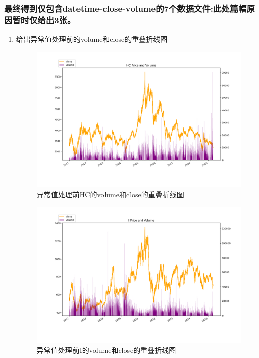 \documentclass[a4paper,11pt]{ctexart}
\begin{document}
\subsubsection{最终得到仅包含datetime-close-volume的7个数据文件:此处篇幅原因暂时仅给出3张。}
\begin{enumerate}
  \item 给出异常值处理前的volume和close的重叠折线图
\FloatBarrier
\noindent
\begin{figure}[H]
  \centering
  \includegraphics[width=\textwidth]{./v2/v0/HC.png}
  \caption*{异常值处理前HC的volume和close的重叠折线图}
\end{figure}
\begin{figure}[H]
  \centering
  \includegraphics[width=\textwidth]{./v2/v0/I.png}
  \caption*{异常值处理前I的volume和close的重叠折线图}
\end{figure}

\end{enumerate}
\end{document}
